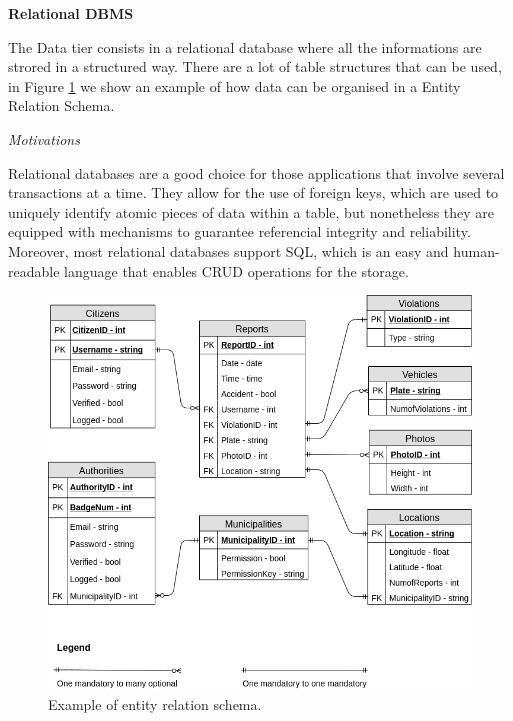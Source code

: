 \documentclass{report}
\begin{document}
\vspace{2mm}
\begin{center}\large{\textbf{Relational DBMS}}\end{center}
The Data tier consists in a relational database where all the informations are strored in a structured way. 
There are a lot of table structures that can be used, in Figure \ref{fig:RDBMS} we show an example of how data can be organised in a Entity Relation Schema.
\begin{center}\large{\textit{Motivations}}\end{center}
Relational databases are a good choice for those applications that involve several transactions at a time. They allow for the use of foreign keys, which are used to uniquely identify atomic pieces of data within a table, but nonetheless they are equipped with mechanisms to guarantee referencial integrity and reliability. Moreover, most relational databases support SQL, which is an easy and human-readable language that enables CRUD operations for the storage.
\begin{figure}[H]
	\begin{center}
	\includegraphics[width=\textwidth]{img/RDBMS.png}
    \end{center}
    \label{fig:RDBMS}
    \caption{Example of entity relation schema.}
\end{figure}

\vspace{4mm}
\end{document}
